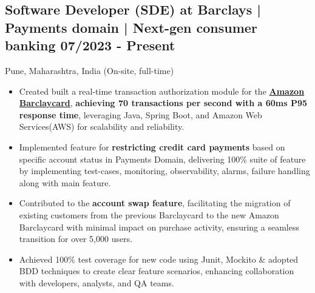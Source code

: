 \documentclass[a4,10pt]{article}
\newcommand{\subtext}[1]{
#1\par\vspace{-0.2cm}}
\newenvironment{zitemize}{
\begin{itemize}\itemsep0pt \parskip0pt \parsep1pt}
{\end{itemize}\vspace{-0.5cm}}
\begin{document}

\subsection*{Software Developer (SDE) at Barclays | Payments domain | Next-gen consumer banking \hfill 07/2023 - Present} 
\subtext{Pune, Maharashtra, India {\normalsize\normalfont (On-site, full-time) }} 
    \begin{zitemize}
        \item Created built a real-time transaction authorization module for the \href{https://www.amazon.co.uk/dp/B0BH98211K}{\textbf{Amazon Barclaycard}}, \textbf{achieving 70 transactions per second with a 60ms P95 response time}, leveraging Java, Spring Boot, and Amazon Web Services(AWS) for scalability and reliability.
        \item Implemented feature for \textbf{restricting credit card payments} based on specific account status in Payments Domain, delivering 100\% suite of feature by implementing test-cases, monitoring, observability, alarms, failure handling along with main feature.
        \item Contributed to the \textbf{account swap feature}, facilitating the migration of existing customers from the previous Barclaycard to the new Amazon Barclaycard with minimal impact on purchase activity, ensuring a seamless transition for over 5,000 users.
        \item Achieved 100\% test coverage for new code using Junit, Mockito \& adopted BDD techniques to create clear feature scenarios, enhancing collaboration with developers, analysts, and QA teams.
    \end{zitemize}
\end{document}
